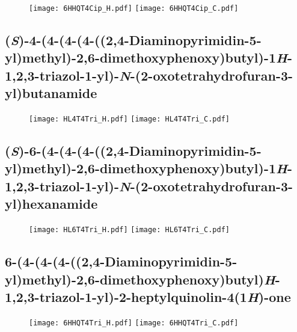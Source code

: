 \begin{figure}[H]
	\centering
		\texttt{[image: 6HHQT4Cip\_H.pdf]}
		\texttt{[image: 6HHQT4Cip\_C.pdf]}
\end{figure}

\subsection{(\textit{S})-4-(4-(4-(4-((2,4-Diaminopyrimidin-5-yl)methyl)-2,6-dimethoxyphenoxy)\allowbreak bu\allowbreak tyl)-1\textit{H}-1,2,3-triazol-1-yl)-\textit{N}-(2-oxotetrahydrofuran-3-yl)butanamide }

\begin{figure}[H]
	\centering
		\texttt{[image: HL4T4Tri\_H.pdf]}
		\texttt{[image: HL4T4Tri\_C.pdf]}
\end{figure}

\subsection{(\textit{S})-6-(4-(4-(4-((2,4-Diaminopyrimidin-5-yl)methyl)-2,6-dimethoxyphenoxy)bu\allowbreak tyl)-1\textit{H}-1,2,3-triazol-1-yl)-\textit{N}-(2-oxotetrahydrofuran-3-yl)hexanamide }

\begin{figure}[H]
	\centering
		\texttt{[image: HL6T4Tri\_H.pdf]}
		\texttt{[image: HL6T4Tri\_C.pdf]}
\end{figure}

\subsection{6-(4-(4-(4-((2,4-Diaminopyrimidin-5-yl)methyl)-2,6-dimethoxyphenoxy)butyl)\textit{H}-1,2,3-triazol-1-yl)-2-heptylquinolin-4(1\textit{H})-one }

\begin{figure}[H]
	\centering
		\texttt{[image: 6HHQT4Tri\_H.pdf]}
		\texttt{[image: 6HHQT4Tri\_C.pdf]}
\end{figure}

